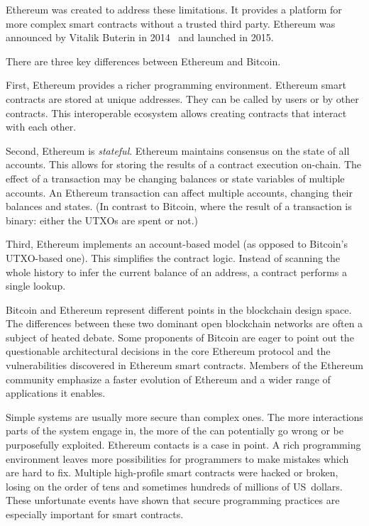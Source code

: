 Ethereum was created to address these limitations.
It provides a platform for more complex smart contracts without a trusted third party.
Ethereum was announced by Vitalik Buterin in 2014~\cite{Buterin2014, Wood2014} and launched in 2015.

There are three key differences between Ethereum and Bitcoin.

First, Ethereum provides a richer programming environment.
Ethereum smart contracts are stored at unique addresses.
They can be called by users or by other contracts.
This interoperable ecosystem allows creating contracts that interact with each other.

Second, Ethereum is \textit{stateful}.
Ethereum maintains consensus on the state of all accounts.
This allows for storing the results of a contract execution on-chain.
The effect of a transaction may be changing balances or state variables of multiple accounts.
An Ethereum transaction can affect multiple accounts, changing their balances and states.
(In contrast to Bitcoin, where the result of a transaction is binary: either the UTXOs are spent or not.)

Third, Ethereum implements an account-based model (as opposed to Bitcoin's UTXO-based one).
This simplifies the contract logic.
Instead of scanning the whole history to infer the current balance of an address, a contract performs a single lookup.

Bitcoin and Ethereum represent different points in the blockchain design space.
The differences between these two dominant open blockchain networks are often a subject of heated debate.
Some proponents of Bitcoin are eager to point out the questionable architectural decisions in the core Ethereum protocol and the vulnerabilities discovered in Ethereum smart contracts.
Members of the Ethereum community emphasize a faster evolution of Ethereum and a wider range of applications it enables.

Simple systems are usually more secure than complex ones.
The more interactions parts of the system engage in, the more of the can potentially go wrong or be purposefully exploited.
Ethereum contacts is a case in point.
A rich programming environment leaves more possibilities for programmers to make mistakes which are hard to fix.
Multiple high-profile smart contracts were hacked or broken, losing on the order of tens and sometimes hundreds of millions of US~dollars.
These unfortunate events have shown that secure programming practices are especially important for smart contracts.

